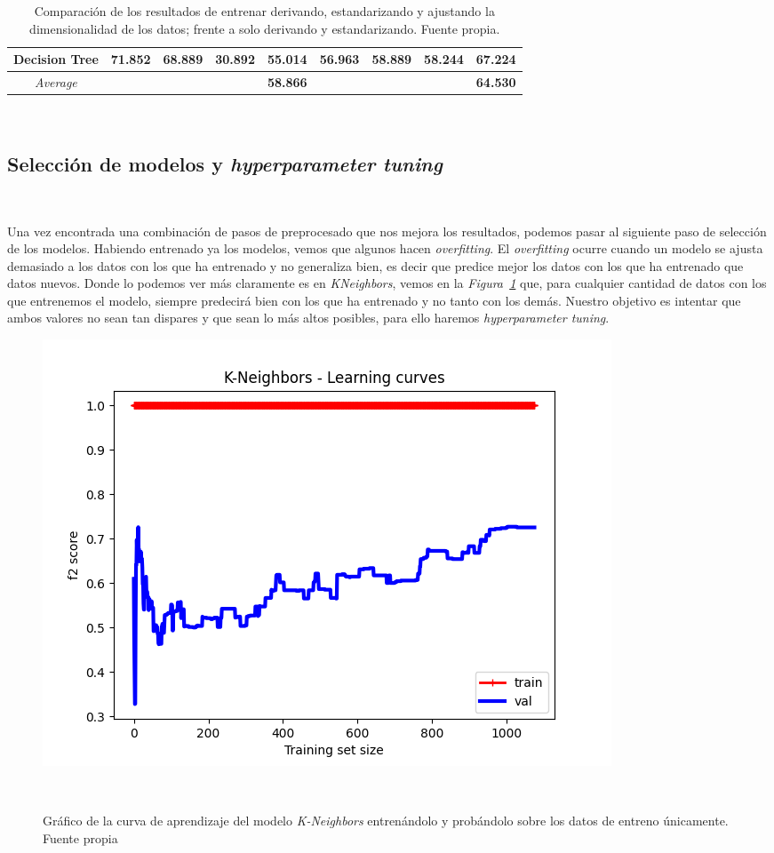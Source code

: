 \begin{table}[!h]
{\begin{tabular}{|c|cccc|cccc|}
        Decision Tree & 71.852 & 68.889 & 30.892 & \textbf{55.014} & 56.963 & 58.889 & 58.244 & \textbf{67.224} \\ \hline
        \textit{Average} & ~ & ~ & ~ & \textbf{58.866} & ~ & ~ & ~ & \textbf{64.530} \\ \hline
        \end{tabular}} 
    \caption{Comparación de los resultados de entrenar derivando, estandarizando y ajustando la dimensionalidad de los datos; frente a solo derivando y estandarizando. Fuente propia.}\ \label{tab:derivative-standarization-dimensionality-results}
\end{table}


\subsection{Selección de modelos y \textit{hyperparameter tuning}}\ \label{sec:entrenamiento}

Una vez encontrada una combinación de pasos de preprocesado que nos mejora los resultados, podemos pasar al siguiente paso de selección de los modelos. Habiendo entrenado ya los modelos, vemos que algunos hacen \textit{overfitting}. El \textit{overfitting} ocurre cuando un modelo se ajusta demasiado a los datos con los que ha entrenado y no generaliza bien, es decir que predice mejor los datos con los que ha entrenado que datos nuevos. Donde lo podemos ver más claramente es en \textit{KNeighbors}, vemos en la \textit{Figura\ \ref{fig:lc-knn}} que, para cualquier cantidad de datos con los que entrenemos el modelo, siempre predecirá bien con los que ha entrenado y no tanto con los demás. Nuestro objetivo es intentar que ambos valores no sean tan dispares y que sean lo más altos posibles, para ello haremos \textit{hyperparameter tuning}.

\begin{figure}[!h]
    \centering
    \includegraphics[width=0.7\linewidth]{media/images/learing-curves-knn.png}
    \caption{Gráfico de la curva de aprendizaje del modelo \textit{K-Neighbors} entrenándolo y probándolo sobre los datos de entreno únicamente. Fuente propia}\ \label{fig:lc-knn}
\end{figure}

